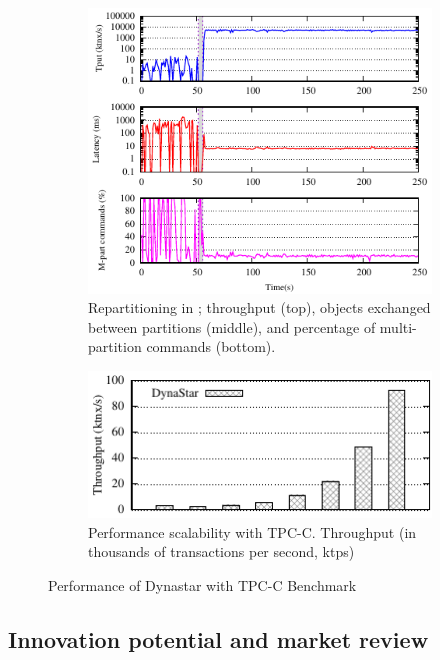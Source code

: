 \begin{figure}[ht!]
  \centering
  \begin{subfigure}{.48\textwidth}
    \centering
    \includegraphics[width=0.8\columnwidth]{figures/tpcc-detail-dynastar}
  \caption{Repartitioning in \dynastar; throughput (top), objects exchanged
  between partitions (middle), and percentage of multi-partition commands
  (bottom).}
  \end{subfigure}
  \begin{subfigure}{.48\textwidth}
    \centering
    \includegraphics[width=\textwidth]{./figures/tpcc-scaling-tp-lat-bridge}
    \caption{Performance scalability with TPC-C. Throughput (in thousands of transactions per second, ktps)}
  \end{subfigure}
  \caption{Performance of Dynastar with TPC-C Benchmark}
  \label{fig:tpcc}
\end{figure}

\subsection{Innovation potential and market review} 

